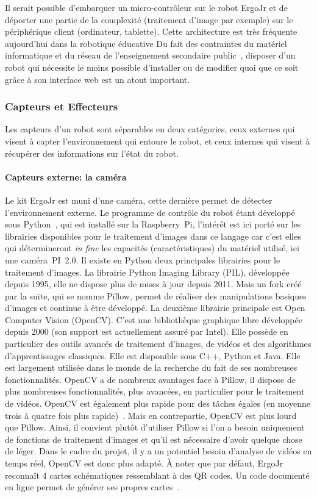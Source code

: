             Il serait possible d'embarquer un micro-contrôleur sur le robot ErgoJr et de déporter une partie de la complexité (traitement d'image par exemple) sur le périphérique client (ordinateur, tablette). Cette architecture est très fréquente aujourd'hui dans la robotique éducative 
            Du fait des contraintes du matériel informatique et du réseau de l'enseignement secondaire public~, disposer d'un robot qui nécessite le moins possible d'installer ou de modifier quoi que ce soit grâce à son interface web est un atout important.
        \subsubsection{Capteurs et Effecteurs}
            Les capteurs d'un robot sont séparables en deux catégories, ceux externes qui visent à capter l'environnement qui entoure le robot, et ceux internes qui visent à récupérer des informations sur l'état du robot.
            \paragraph{Capteurs externe: la caméra}
                {Le kit ErgoJr est muni d’une caméra, cette dernière permet de détecter l’environnement externe. Le programme de contrôle du robot étant développé sous Python~, qui est installé sur la Raspberry~Pi, l'intérêt est ici porté sur les librairies disponibles pour le traitement d’images dans ce langage car c'est elles qui détermineront \textit{in fine} les capacités (caractéristiques) du matériel utilisé, ici une caméra~PI~2.0.
                Il existe en Python deux principales librairies pour le traitement d’images.
                La librairie Python Imaging Library (PIL), développée depuis 1995, elle ne dispose plus de mises à jour depuis 2011. Mais un fork créé par la suite, qui se nomme Pillow, permet de réaliser des manipulations basiques d’images et continue à être développé.
                La deuxième librairie principale est Open Computer Vision (OpenCV). C'est une bibliothèque graphique libre développée depuis 2000 (son support est actuellement assuré par Intel). Elle possède en particulier des outils avancés de traitement d’images, de vidéos et des algorithmes d’apprentissages classiques. Elle est disponible sous C++, Python et Java. Elle est largement utilisée dans le monde de la recherche du fait de ses nombreuses fonctionnalités.
                OpenCV a de nombreux avantages face à Pillow, il dispose de plus nombreuses fonctionnalités, plus avancées, en particulier pour le traitement de vidéos. OpenCV est également plus rapide pour des tâches égales (en moyenne trois à quatre fois plus rapide)~. Mais en contrepartie, OpenCV est plus lourd que Pillow.
                Ainsi, il convient plutôt d’utiliser Pillow si l’on a besoin uniquement de fonctions de traitement d’images et qu'il est nécessaire d'avoir quelque chose de léger. Dans le cadre du projet, il y a un potentiel besoin d’analyse de vidéos en temps réel, OpenCV est donc plus adapté.}%
                À noter que par défaut, ErgoJr reconnaît 4 cartes schématiques ressemblant à des QR codes. Un code documenté en ligne permet de générer ses propres cartes~.
